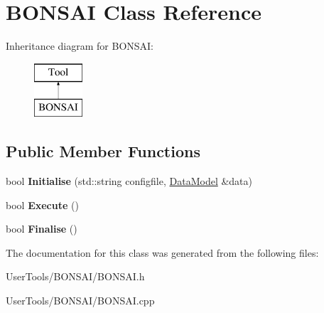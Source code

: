 \hypertarget{classBONSAI}{\section{B\-O\-N\-S\-A\-I Class Reference}
\label{classBONSAI}
}
Inheritance diagram for B\-O\-N\-S\-A\-I\-:\begin{figure}[H]
\begin{center}
\leavevmode
\includegraphics[height=2.000000cm]{classBONSAI}
\end{center}
\end{figure}
\subsection*{Public Member Functions}
\begin{DoxyCompactItemize}
\item 
\hypertarget{classBONSAI_a6f4e955fe871d3f87c9a086f8b27c23b}{bool {\bfseries Initialise} (std\-::string configfile, \hyperlink{classDataModel}{Data\-Model} \&data)}\label{classBONSAI_a6f4e955fe871d3f87c9a086f8b27c23b}

\item 
\hypertarget{classBONSAI_af232a6e7bbe7998f330a1b199e19d563}{bool {\bfseries Execute} ()}\label{classBONSAI_af232a6e7bbe7998f330a1b199e19d563}

\item 
\hypertarget{classBONSAI_aca309e129f0863903b826e3a9224ae72}{bool {\bfseries Finalise} ()}\label{classBONSAI_aca309e129f0863903b826e3a9224ae72}

\end{DoxyCompactItemize}


The documentation for this class was generated from the following files\-:\begin{DoxyCompactItemize}
\item 
User\-Tools/\-B\-O\-N\-S\-A\-I/B\-O\-N\-S\-A\-I.\-h\item 
User\-Tools/\-B\-O\-N\-S\-A\-I/B\-O\-N\-S\-A\-I.\-cpp\end{DoxyCompactItemize}
